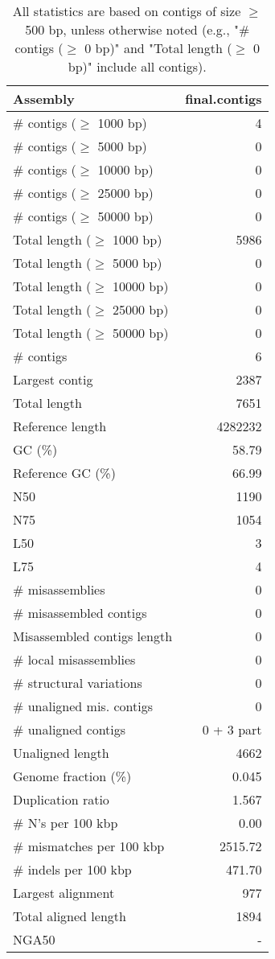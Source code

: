 \documentclass[12pt,a4paper]{article}
\begin{document}
\begin{table}[ht]
\begin{center}
\caption{All statistics are based on contigs of size $\geq$ 500 bp, unless otherwise noted (e.g., "\# contigs ($\geq$ 0 bp)" and "Total length ($\geq$ 0 bp)" include all contigs).}
\begin{tabular}{|l*{1}{|r}|}
\hline
Assembly & final.contigs \\ \hline
\# contigs ($\geq$ 1000 bp) & 4 \\ \hline
\# contigs ($\geq$ 5000 bp) & 0 \\ \hline
\# contigs ($\geq$ 10000 bp) & 0 \\ \hline
\# contigs ($\geq$ 25000 bp) & 0 \\ \hline
\# contigs ($\geq$ 50000 bp) & 0 \\ \hline
Total length ($\geq$ 1000 bp) & 5986 \\ \hline
Total length ($\geq$ 5000 bp) & 0 \\ \hline
Total length ($\geq$ 10000 bp) & 0 \\ \hline
Total length ($\geq$ 25000 bp) & 0 \\ \hline
Total length ($\geq$ 50000 bp) & 0 \\ \hline
\# contigs & 6 \\ \hline
Largest contig & 2387 \\ \hline
Total length & 7651 \\ \hline
Reference length & 4282232 \\ \hline
GC (\%) & 58.79 \\ \hline
Reference GC (\%) & 66.99 \\ \hline
N50 & 1190 \\ \hline
N75 & 1054 \\ \hline
L50 & 3 \\ \hline
L75 & 4 \\ \hline
\# misassemblies & 0 \\ \hline
\# misassembled contigs & 0 \\ \hline
Misassembled contigs length & 0 \\ \hline
\# local misassemblies & 0 \\ \hline
\# structural variations & 0 \\ \hline
\# unaligned mis. contigs & 0 \\ \hline
\# unaligned contigs & 0 + 3 part \\ \hline
Unaligned length & 4662 \\ \hline
Genome fraction (\%) & 0.045 \\ \hline
Duplication ratio & 1.567 \\ \hline
\# N's per 100 kbp & 0.00 \\ \hline
\# mismatches per 100 kbp & 2515.72 \\ \hline
\# indels per 100 kbp & 471.70 \\ \hline
Largest alignment & 977 \\ \hline
Total aligned length & 1894 \\ \hline
NGA50 & - \\ \hline
\end{tabular}
\end{center}
\end{table}
\end{document}
